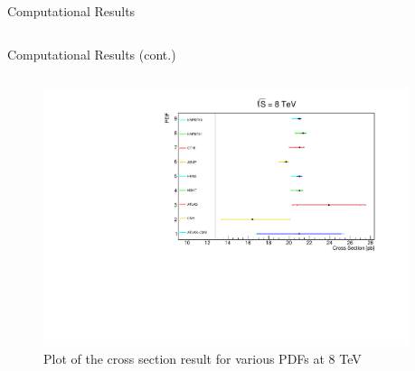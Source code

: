 \documentclass[10pt,t]{beamer}
\begin{document}
\begin{frame}{Computational Results}
\begin{columns}
\begin{column}{0.5\textwidth}
        \end{column}
        
    \end{columns}
\end{frame}


\begin{frame}{Computational Results (cont.)}

     \hspace{2mm}   
     \small
    \begin{columns}
        \begin{column}{0.5\textwidth}
          \begin{figure}
                \centering
                \includegraphics[scale=0.3]{Images/Graph2.pdf}
                 \caption{Plot of the cross section result for various PDFs at 8 TeV}
           \end{figure}
            
        \end{column}


        
        \begin{column}{0.5\textwidth}
            


\end{column}
\end{columns}
\end{frame}
\end{document}
